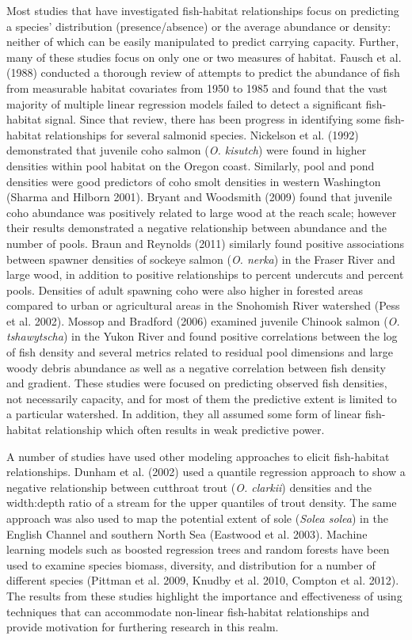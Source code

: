 \documentclass[
  12pt,
]{article}
\begin{document}
Most studies that have investigated fish-habitat relationships focus on predicting a species' distribution (presence/absence) or the average abundance or density: neither of which can be easily manipulated to predict carrying capacity. Further, many of these studies focus on only one or two measures of habitat. Fausch et al. (1988) conducted a thorough review of attempts to predict the abundance of fish from measurable habitat covariates from 1950 to 1985 and found that the vast majority of multiple linear regression models failed to detect a significant fish-habitat signal. Since that review, there has been progress in identifying some fish-habitat relationships for several salmonid species. Nickelson et al. (1992) demonstrated that juvenile coho salmon (\emph{O. kisutch}) were found in higher densities within pool habitat on the Oregon coast. Similarly, pool and pond densities were good predictors of coho smolt densities in western Washington (Sharma and Hilborn 2001). Bryant and Woodsmith (2009) found that juvenile coho abundance was positively related to large wood at the reach scale; however their results demonstrated a negative relationship between abundance and the number of pools. Braun and Reynolds (2011) similarly found positive associations between spawner densities of sockeye salmon (\emph{O. nerka}) in the Fraser River and large wood, in addition to positive relationships to percent undercuts and percent pools. Densities of adult spawning coho were also higher in forested areas compared to urban or agricultural areas in the Snohomish River watershed (Pess et al. 2002). Mossop and Bradford (2006) examined juvenile Chinook salmon (\emph{O. tshawytscha}) in the Yukon River and found positive correlations between the log of fish density and several metrics related to residual pool dimensions and large woody debris abundance as well as a negative correlation between fish density and gradient. These studies were focused on predicting observed fish densities, not necessarily capacity, and for most of them the predictive extent is limited to a particular watershed. In addition, they all assumed some form of linear fish-habitat relationship which often results in weak predictive power.

A number of studies have used other modeling approaches to elicit fish-habitat relationships. Dunham et al. (2002) used a quantile regression approach to show a negative relationship between cutthroat trout (\emph{O. clarkii}) densities and the width:depth ratio of a stream for the upper quantiles of trout density. The same approach was also used to map the potential extent of sole (\emph{Solea solea}) in the English Channel and southern North Sea (Eastwood et al. 2003). Machine learning models such as boosted regression trees and random forests have been used to examine species biomass, diversity, and distribution for a number of different species (Pittman et al. 2009, Knudby et al. 2010, Compton et al. 2012). The results from these studies highlight the importance and effectiveness of using techniques that can accommodate non-linear fish-habitat relationships and provide motivation for furthering research in this realm.
\end{document}
